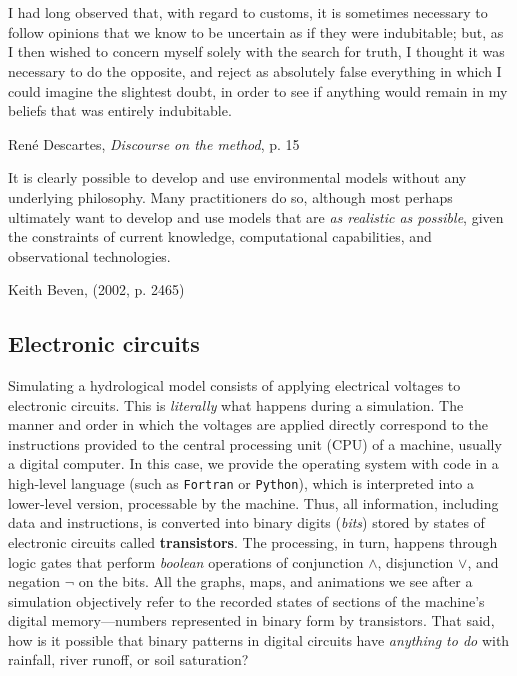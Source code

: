 \documentclass[./main_en.tex]{subfiles}
\begin{document}
\chapter{\chapEpisEn} \label{chap:episteme}

\setlength{\parskip}{0mm}

\epigraph{\small{I had long observed that, with regard to customs, it is sometimes necessary to follow opinions that we know to be uncertain as if they were indubitable; but, as I then wished to concern myself solely with the search for truth, I thought it was necessary to do the opposite, and reject as absolutely false everything in which I could imagine the slightest doubt, in order to see if anything would remain in my beliefs that was entirely indubitable.}}{René Descartes, \textit{Discourse on the method}, p. 15 \cite{descartes2008discurso}}

\epigraph{\small{It is clearly possible to develop and use environmental models without any underlying philosophy. Many practitioners do so, although most perhaps ultimately want to develop and use models that are \textit{as realistic as possible}, given the constraints of current knowledge, computational capabilities, and observational technologies.}}{Keith Beven, (2002, p. 2465) \cite{Beven2002a}}


\setlength{\parskip}{\myparskip}

\section{Electronic circuits}\label{sec:epis:intro}

\par Simulating a hydrological \gls{model} consists of applying electrical voltages to electronic circuits. This is \textit{literally} what happens during a simulation. The manner and order in which the voltages are applied directly correspond to the instructions provided to the central processing unit (CPU) of a machine, usually a digital computer. In this case, we provide the operating \gls{system} with code in a high-level language (such as \texttt{Fortran} or \texttt{Python}), which is interpreted into a lower-level version, processable by the machine. Thus, all information, including data and instructions, is converted into binary digits (\textit{bits}) stored by states of electronic circuits called \textbf{transistors}. The processing, in turn, happens through logic gates that perform \textit{boolean} operations of conjunction $\land$, disjunction $\lor$, and negation $\neg$ on the bits. All the graphs, maps, and animations we see after a simulation objectively refer to the recorded states of sections of the machine's digital memory—numbers represented in binary form by transistors. That said, how is it possible that binary patterns in digital circuits have \textit{anything to do} with rainfall, river runoff, or soil saturation?
\end{document}
